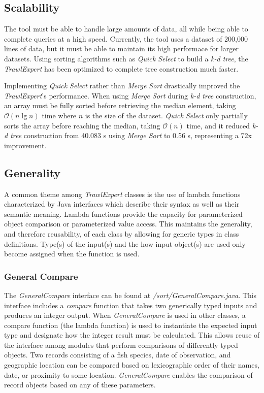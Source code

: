 \documentclass{article}
\begin{document}
\subsection{Scalability}
The tool must be able to handle large amounts of data, all while being able to complete queries at a high speed. Currently, the tool uses a dataset of 200,000 lines of data, but it must be able to maintain its high performace for larger datasets. Using sorting algorithms such as \textit{Quick Select} to build a \textit{k-d tree}, the \textit{TrawlExpert} has been optimized to complete tree construction much faster.

Implementing \textit{Quick Select} rather than \textit{Merge Sort} drastically improved the \textit{TrawlExpert}'s performance. When using \textit{Merge Sort} during \textit{k-d tree} construction, an array must be fully sorted before retrieving the median element, taking $\mathcal{O}(n\lg n)$ time where $n$ is the size of the dataset. \textit{Quick Select} only partially sorts the array before reaching the median, taking $\mathcal{O}(n)$ time, and it reduced \textit{k-d tree} construction from 40.083 s using \textit{Merge Sort} to 0.56 s, representing a 72x improvement. 

\subsection{Generality}
A common theme among \textit{TrawlExpert} classes is the use of lambda functions characterized by Java interfaces which describe their syntax as well as their semantic meaning. Lambda functions provide the capacity for parameterized object comparison or parameterized value access. This maintains the generality, and therefore reusability, of each class by allowing for generic types in class definitions. Type(s) of the input(s) and the how input object(s) are used only become assigned when the function is used.

\subsubsection{General Compare}
The \textit{GeneralCompare} interface can be found at \textit{/sort/GeneralCompare.java}. This interface includes a \textit{compare} function that takes two generically typed inputs and produces an integer output. When \textit{GeneralCompare} is used in other classes, a compare function (the lambda function) is used to instantiate the expected input type and designate how the integer result must be calculated. This allows reuse of the interface among modules that perform comparisons of differently typed objects. Two records consisting of a fish species, date of observation, and geographic location can be compared based on lexicographic order of their names, date, or proximity to some location. \textit{GeneralCompare} enables the comparison of record objects based on any of these parameters. 
\end{document}
